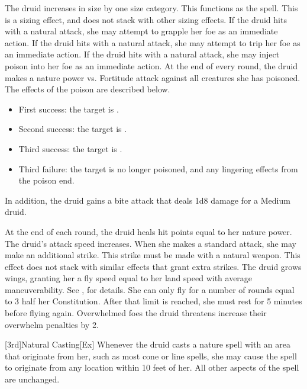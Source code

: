         The druid increases in size by one size category.
        This functions as the  spell.
        This is a sizing effect, and does not stack with other sizing effects.
        If the druid hits with a natural attack, she may attempt to grapple her foe as an immediate action.
        If the druid hits with a natural attack, she may attempt to trip her foe as an immediate action.
        If the druid hits with a natural attack, she may inject poison into her foe as an immediate action.
        At the end of every round, the druid makes a nature power vs. Fortitude attack against all creatures she has poisoned.
        The effects of the poison are described below.
        \begin{itemize}
            \item First success: the target is \sickened.
            \item Second success: the target is \staggered.
            \item Third success: the target is \nauseated.
            \item Third failure: the target is no longer poisoned, and any lingering effects from the poison end.
        \end{itemize}
        \par In addition, the druid gains a bite attack that deals 1d8 damage for a Medium druid.

        At the end of each round, the druid heals hit points equal to her nature power.
        The druid's attack speed increases.
        When she makes a standard attack, she may make an additional strike.
        This strike must be made with a natural weapon.
        This effect does not stack with similar effects that grant extra strikes.
        The druid grows wings, granting her a fly speed equal to her land speed with average maneuverability.
        See , for details.
        She can only fly for a number of rounds equal to 3 \add half her Constitution.
        After that limit is reached, she must rest for 5 minutes before flying again.
        Overwhelmed foes the druid threatens increase their overwhelm penalties by 2.

        [3rd]{Natural Casting}[Ex]
        Whenever the druid casts a nature spell with an area that originate from her, such as most cone or line spells, she may cause the spell to originate from any location within 10 feet of her.
        All other aspects of the spell are unchanged.

